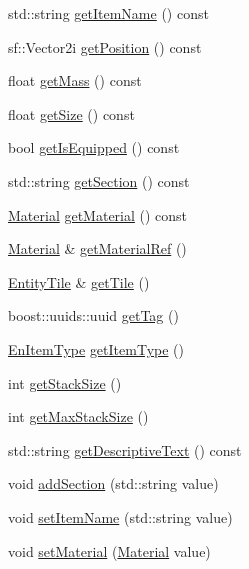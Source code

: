 \begin{DoxyCompactItemize}
\item 
std\+::string \mbox{\hyperlink{class_item_a806159273f1f9fbb07fe75a74f2f51c5}{get\+Item\+Name}} () const
\item 
sf\+::\+Vector2i \mbox{\hyperlink{class_item_ab015078a1ea19c197fc88b7a556d37cc}{get\+Position}} () const
\item 
float \mbox{\hyperlink{class_item_a452c0983b99f1b148949274b63ed79fd}{get\+Mass}} () const
\item 
float \mbox{\hyperlink{class_item_a2a84b0b0b25d4d1e8bb1b456d8094b84}{get\+Size}} () const
\item 
bool \mbox{\hyperlink{class_item_a9839c6a1b61487bbbe15b7ebba07de34}{get\+Is\+Equipped}} () const
\item 
std\+::string \mbox{\hyperlink{class_item_abe4ed40d2027ca131b669d471b47f29f}{get\+Section}} () const
\item 
\mbox{\hyperlink{class_material}{Material}} \mbox{\hyperlink{class_item_ada6692d4e0e9e8f9a9a78a13fd6522d8}{get\+Material}} () const
\item 
\mbox{\hyperlink{class_material}{Material}} \& \mbox{\hyperlink{class_item_af22ec5d207b70e2a3359e76dccfc7e11}{get\+Material\+Ref}} ()
\item 
\mbox{\hyperlink{class_entity_tile}{Entity\+Tile}} \& \mbox{\hyperlink{class_item_a61272a187be1a07a49685cbee45d30bd}{get\+Tile}} ()
\item 
boost\+::uuids\+::uuid \mbox{\hyperlink{class_item_a5e829376b05757d63d2593fb378d05ff}{get\+Tag}} ()
\item 
\mbox{\hyperlink{_equipment_8hpp_a3c7fe24829a0b210a1a4d36e29ac01c6}{En\+Item\+Type}} \mbox{\hyperlink{class_item_aa8320312184b0cbf28d047d68059f1b1}{get\+Item\+Type}} ()
\item 
int \mbox{\hyperlink{class_item_a7cbcf6f1a3b7c07a05b9cc0954e677db}{get\+Stack\+Size}} ()
\item 
int \mbox{\hyperlink{class_item_ac8e94ab96931949a517490d1c4b37287}{get\+Max\+Stack\+Size}} ()
\item 
std\+::string \mbox{\hyperlink{class_item_acc7555345dbfa5a079622fb3eec6f5b7}{get\+Descriptive\+Text}} () const
\item 
void \mbox{\hyperlink{class_item_a6c9f73ef36b176cdb75bc9b13d5be8e8}{add\+Section}} (std\+::string value)
\item 
void \mbox{\hyperlink{class_item_ae8dd38d585a7795f134f6453feb1000e}{set\+Item\+Name}} (std\+::string value)
\item 
void \mbox{\hyperlink{class_item_af8f9e1899f933fc2ae2cdee6c7de0a4e}{set\+Material}} (\mbox{\hyperlink{class_material}{Material}} value)

\end{DoxyCompactItemize}
